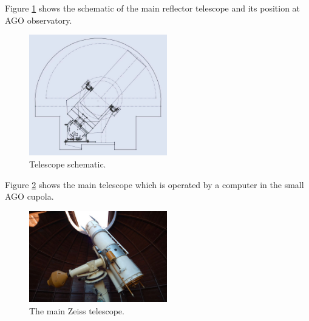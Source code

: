 	Figure \ref{fig:fmpiago1} shows the schematic of the main reflector telescope and its position at AGO observatory.
	
\begin{figure}[H]
  \centering
  \includegraphics[width=6cm]{images/FMPIAGO1}
  \caption{Telescope schematic.}
  \label{fig:fmpiago1}
\end{figure}

	Figure \ref{fig:fmpiago2} shows the main telescope which is operated by a computer in the small AGO cupola.

\begin{figure}[H]
\centering
  \includegraphics[width=6cm]{images/FMPIAGO2}
  \caption{The main Zeiss telescope.}
  \label{fig:fmpiago2}
\end{figure}